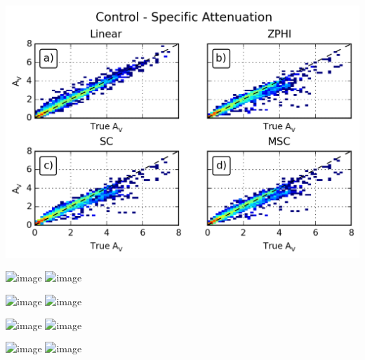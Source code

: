 \documentclass[red]{beamer}
\begin{document}
\begin{frame}
    \begin{center}
        \includegraphics[scale=0.7]{figures/spatial/X_Control_Specific_Attenuation_V_scatter}
    \end{center}
\end{frame}

\begin{frame}
    \begin{center}
        \includegraphics<1>[scale=0.7]{figures/spatial/C_Sidelobe_Attenuation_V}
        \includegraphics<2>[scale=0.7]{figures/spatial/C_Control_Attenuation_V}
    \end{center}
\end{frame}

\begin{frame}
    \begin{center}
        \includegraphics<1>[scale=0.7]{figures/spatial/C_Sidelobe_Attenuation_Difference_V}
        \includegraphics<2>[scale=0.7]{figures/spatial/C_Control_Attenuation_Difference_V}
    \end{center}
\end{frame}

\begin{frame}
    \begin{center}
        \includegraphics<1>[scale=0.7]{figures/spatial/C_Sidelobe_Specific_Attenuation_V_scatter}
        \includegraphics<2>[scale=0.7]{figures/spatial/C_Control_Specific_Attenuation_V_scatter}
    \end{center}
\end{frame}

\begin{frame}
    \begin{center}
        \includegraphics<1>[scale=0.7]{figures/spatial/X_Sidelobe_Attenuation_V}
        \includegraphics<2>[scale=0.7]{figures/spatial/X_Control_Attenuation_V}
    \end{center}
\end{frame}
\end{document}
